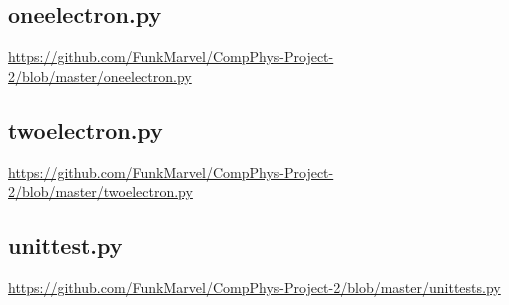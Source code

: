 \documentclass[english,notitlepage,reprint]{revtex4-1}  %
\begin{document}
\subsection{oneelectron.py} \label{A:3}
\url{https://github.com/FunkMarvel/CompPhys-Project-2/blob/master/oneelectron.py}

\subsection{twoelectron.py} \label{A:4}
\url{https://github.com/FunkMarvel/CompPhys-Project-2/blob/master/twoelectron.py}

\subsection{unittest.py}\label{A:5}
\url{https://github.com/FunkMarvel/CompPhys-Project-2/blob/master/unittests.py}
\end{document}
